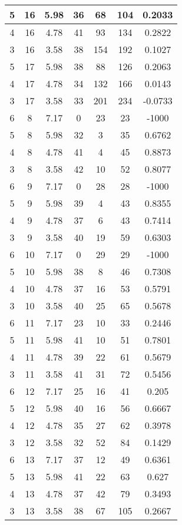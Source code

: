 \documentclass[letterpaper, 12pt]{article}
\begin{document}
\begin{longtable}{|c|c|c|c|c|c|c|}
\hline
5 & 16 & 5.98 & 36 & 68 & 104 & 0.2033 \\
\hline
4 & 16 & 4.78 & 41 & 93 & 134 & 0.2822 \\
\hline
3 & 16 & 3.58 & 38 & 154 & 192 & 0.1027 \\
\hline
5 & 17 & 5.98 & 38 & 88 & 126 & 0.2063 \\
\hline
4 & 17 & 4.78 & 34 & 132 & 166 & 0.0143 \\
\hline
3 & 17 & 3.58 & 33 & 201 & 234 & -0.0733 \\
\hline
6 & 8 & 7.17 & 0 & 23 & 23 & -1000 \\
\hline
5 & 8 & 5.98 & 32 & 3 & 35 & 0.6762 \\
\hline
4 & 8 & 4.78 & 41 & 4 & 45 & 0.8873 \\
\hline
3 & 8 & 3.58 & 42 & 10 & 52 & 0.8077 \\
\hline
6 & 9 & 7.17 & 0 & 28 & 28 & -1000 \\
\hline
5 & 9 & 5.98 & 39 & 4 & 43 & 0.8355 \\
\hline
4 & 9 & 4.78 & 37 & 6 & 43 & 0.7414 \\
\hline
3 & 9 & 3.58 & 40 & 19 & 59 & 0.6303 \\
\hline
6 & 10 & 7.17 & 0 & 29 & 29 & -1000 \\
\hline
5 & 10 & 5.98 & 38 & 8 & 46 & 0.7308 \\
\hline
4 & 10 & 4.78 & 37 & 16 & 53 & 0.5791 \\
\hline
3 & 10 & 3.58 & 40 & 25 & 65 & 0.5678 \\
\hline
6 & 11 & 7.17 & 23 & 10 & 33 & 0.2446 \\
\hline
5 & 11 & 5.98 & 41 & 10 & 51 & 0.7801 \\
\hline
4 & 11 & 4.78 & 39 & 22 & 61 & 0.5679 \\
\hline
3 & 11 & 3.58 & 41 & 31 & 72 & 0.5456 \\
\hline
6 & 12 & 7.17 & 25 & 16 & 41 & 0.205 \\
\hline
5 & 12 & 5.98 & 40 & 16 & 56 & 0.6667 \\
\hline
4 & 12 & 4.78 & 35 & 27 & 62 & 0.3978 \\
\hline
3 & 12 & 3.58 & 32 & 52 & 84 & 0.1429 \\
\hline
6 & 13 & 7.17 & 37 & 12 & 49 & 0.6361 \\
\hline
5 & 13 & 5.98 & 41 & 22 & 63 & 0.627 \\
\hline
4 & 13 & 4.78 & 37 & 42 & 79 & 0.3493 \\
\hline
3 & 13 & 3.58 & 38 & 67 & 105 & 0.2667 \\

\end{longtable}
\end{document}
